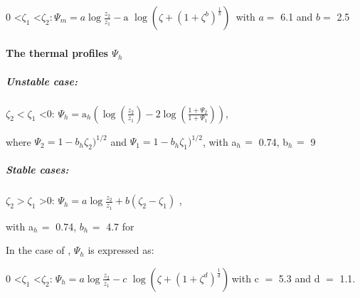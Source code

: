 0 \textless $\zeta_{1}$ \textless $\zeta_{2}$:$_{\, }\Psi_{m} =a \log\frac{z_{2} }{z_{1}
}-\mbox{a}\,\,\log\left( {\zeta+\left( {1+\zeta^{b}} \right)^{\frac{1}{b}}} \right)_{\, }$ with $a
=$ 6.1 and $b =$ 2.5

\paragraph{The thermal profiles $\Psi_{h}$}

\subparagraph{Unstable case:}

$\zeta_{2 }< \zeta_{1}$ \textless 0: $\Psi_{h}
=\mbox{a}_{h} \left( {\log\left( {\frac{z_{2}
}{z_{1} }} \right)-2\log \left(
{\frac{1+\Psi_{2} }{1+\Psi_{1}
}} \right)} \right)$,

where $\Psi_{2} =1-b_{h} \zeta_{2} )^{1/2}$ and $\Psi_{1}
=1-b_{h} \zeta_{1}
)^{1/2}$, with a$_{h\, }=$ 0.74, b$_{h\, }=$ 9

\subparagraph{Stable cases:}

$\zeta_{2 }> \zeta_{1}$ \textgreater 0: $\Psi_{h}
=a\log\frac{z_{2} }{z_{1} }+b(\zeta_{2} -\zeta_{1} )$ ,

with a$_{h\, }=$ 0.74, $b_{h\, }= $ 4.7 for \cite{Businger:1971}

In the case of \cite{Cheng:2005}, $\Psi_{h}$ is expressed as:

0 \textless $\zeta_{1}$ \textless $\zeta_{2}$:$_{\, \, }\Psi_{h} =a \log\frac{z_{2} }{z_{1}
}-c\,\,\log\left( {\zeta+\left( {1+\zeta^{d}} \right)^{\frac{1}{d}}} \right)_{\, }$with c
$=$ 5.3 and d $=$ 1.1.

